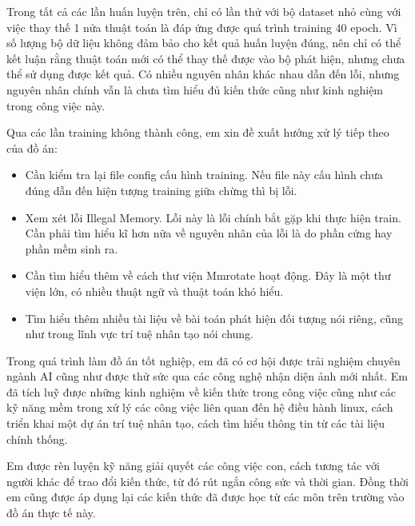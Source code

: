 \documentclass[12pt,a4paper,openany,oneside]{report}
\begin{document}
Trong tất cả các lần huấn luyện trên, chỉ có lần thử với bộ dataset nhỏ cùng với việc thay thế 1 nửa thuật toán là đáp ứng được quá trình training 40 epoch. Vì số lượng bộ dữ liệu không đảm bảo cho kết quả huấn luyện đúng, nên chỉ có thể kết luận rằng thuật toán mới có thể thay thế được vào bộ phát hiện, nhưng chưa thể sử dụng được kết quả. Có nhiều nguyên nhân khác nhau dẫn đến lỗi, nhưng nguyên nhân chính vẫn là chưa tìm hiểu đủ kiến thức cũng như kinh nghiệm trong công việc này.

Qua các lần training không thành công, em xin đề xuất hướng xử lý tiếp theo của đồ án:
\begin{itemize}
	\item Cần kiểm tra lại file config cấu hình training. Nếu file này cấu hình chưa đúng dẫn đến hiện tượng training giữa chừng thì bị lỗi.
	\item Xem xét lỗi Illegal Memory. Lỗi này là lỗi chính bắt gặp khi thực hiện train. Cần phải tìm hiểu kĩ hơn nữa về nguyên nhân của lỗi là do phần cứng hay phần mềm sinh ra.
	\item Cần tìm hiểu thêm về cách thư viện Mmrotate hoạt động. Đây là một thư viện lớn, có nhiều thuật ngữ và thuật toán khó hiểu. 
	\item Tìm hiểu thêm nhiều tài liệu về bài toán phát hiện đối tượng nói riêng, cũng như trong lĩnh vực trí tuệ nhân tạo nói chung.
\end{itemize}

Trong quá trình làm đồ án tốt nghiệp, em đã có cơ hội được trải nghiệm chuyên ngành AI cũng như được thử sức qua các công nghệ nhận diện ảnh mới nhất. Em đã tích luỹ được những kinh nghiệm về kiến thức trong công việc cũng như các kỹ năng mềm trong xử lý các công việc liên quan đến hệ điều hành linux, cách triển khai một dự án trí tuệ nhân tạo, cách tìm hiểu thông tin từ các tài liệu chính thống.
 
Em được rèn luyện kỹ năng giải quyết các công việc con, cách tương tác với người khác để trao đổi kiến thức, từ đó rút ngắn công sức và thời gian. Đồng thời em cũng được áp dụng lại các kiến thức đã được học từ các môn trên trường vào đồ án thực tế này.


\end{document}
